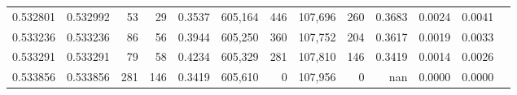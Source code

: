 \begin{tabular}{rrrrrrrrrrrrr}
0.532801 & 0.532992 &    53 &    29 &                                     0.3537 & 605,164 &     446 & 107,696 &     260 & 0.3683 & 0.0024 & 0.0041 \\
0.533236 & 0.533236 &    86 &    56 &                                     0.3944 & 605,250 &     360 & 107,752 &     204 & 0.3617 & 0.0019 & 0.0033 \\
0.533291 & 0.533291 &    79 &    58 &                                     0.4234 & 605,329 &     281 & 107,810 &     146 & 0.3419 & 0.0014 & 0.0026 \\
0.533856 & 0.533856 &   281 &   146 &                                     0.3419 & 605,610 &       0 & 107,956 &       0 &    nan & 0.0000 & 0.0000 \\
\bottomrule
\end{tabular}
